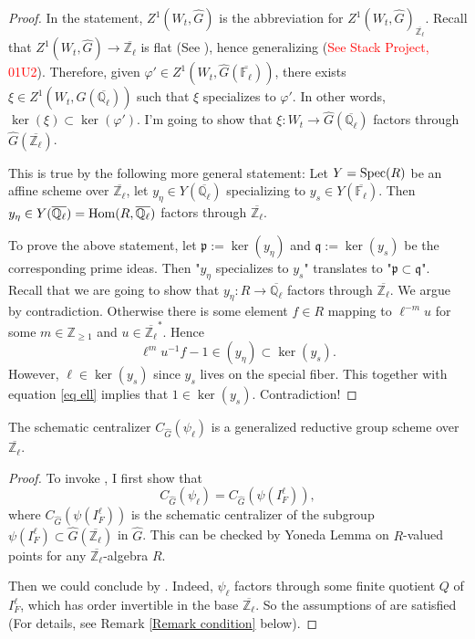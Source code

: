 \begin{proof}
	In the statement, $Z^1(W_t, \hat{G})$ is the abbreviation for $Z^1(W_t, \hat{G})_{\overline{\mathbb{Z}_{\ell}}}$. Recall that $Z^1(W_t, \hat{G}) \to \overline{\mathbb{Z}_{\ell}}$ is flat (See \cite[Proposition 3.3]{dat2022ihes}), hence generalizing (\textcolor{red}{See Stack Project, 01U2}). Therefore, given $\varphi' \in Z^1(W_t, \hat{G}(\overline{\mathbb{F}_{\ell}}))$, there exists $\xi \in Z^1(W_t, \hat{G}(\overline{\mathbb{Q}_{\ell}}))$ such that $\xi$ specializes to $\varphi'$. In other words, $\ker(\xi) \subset \ker(\varphi')$. I'm going to show that $\xi: W_t \to \hat{G}(\overline{\mathbb{Q}_{\ell}})$ factors through  $\hat{G}(\overline{\mathbb{Z}_{\ell}})$.
	
	This is true by the following more general statement: Let $Y=\operatorname{\operatorname{Spec}}(R)$ be an affine scheme over $\overline{\mathbb{Z}_{\ell}}$, let $y_{\eta} \in Y(\overline{\mathbb{Q}_{\ell}})$ specializing to $y_s \in Y(\overline{\mathbb{F}_{\ell}})$.  Then $y_{\eta} \in Y(\overline{\mathbb{Q}_{\ell}})=\operatorname{\operatorname{Hom}}(R, \overline{\mathbb{Q}_{\ell}})$ factors through $\overline{\mathbb{Z}_{\ell}}$.
	
    To prove the above statement, let $\mathfrak{p}:=\ker(y_\eta)$ and $\mathfrak{q}:=\ker(y_s)$ be the corresponding prime ideas. Then "$y_{\eta}$ specializes to $y_s$" translates to "$\mathfrak{p} \subset \mathfrak{q}$". Recall that we are going to show that $y_{\eta}: R \to \overline{\mathbb{Q}_{\ell}}$ factors through $\overline{\mathbb{Z}_{\ell}}$. We argue by contradiction. Otherwise there is some element $f \in R$ mapping to $\ell^{-m}u$ for some $m \in \mathbb{Z}_{\geq 1}$ and $u \in \overline{\mathbb{Z}_{\ell}}^*$. Hence 
    \begin{equation}\label{eq ell}
    	\ell^mu^{-1}f-1 \in (y_{\eta}) \subset \ker(y_s).
    \end{equation}
    However, $\ell \in \ker(y_s)$ since $y_s$ lives on the special fiber. This together with equation \ref{eq ell} implies that $1 \in \ker(y_s)$. Contradiction!
\end{proof}

\begin{lemma}\label{Lem gen red}
	The schematic centralizer $C_{\hat{G}}(\psi_{\ell})$ is a generalized reductive group scheme over $\overline{\mathbb{Z}_{\ell}}$.
\end{lemma}

\begin{proof}
	To invoke \cite[Lemma 3.2]{dat2022ihes}, I first show that $$C_{\hat{G}}(\psi_{\ell})=C_{\hat{G}}(\psi(I_F^{\ell})),$$
	where $C_{\hat{G}}(\psi(I_F^{\ell}))$ is the schematic centralizer of the subgroup $\psi(I_F^{\ell}) \subset \hat{G}(\overline{\mathbb{Z}_{\ell}})$ in $\hat{G}$. This can be checked by Yoneda Lemma on $R$-valued points for any $\overline{\mathbb{Z}_{\ell}}$-algebra $R$.
	
	Then we could conclude by \cite[Lemma 3.2]{dat2022ihes}. Indeed, $\psi_{\ell}$ factors through some finite quotient $Q$ of $I_F^{\ell}$, which has order invertible in the base $\overline{\mathbb{Z}_{\ell}}$. So the assumptions of \cite[Lemma 3.2]{dat2022ihes} are satisfied (For details, see Remark \ref{Remark condition} below). 
\end{proof}

